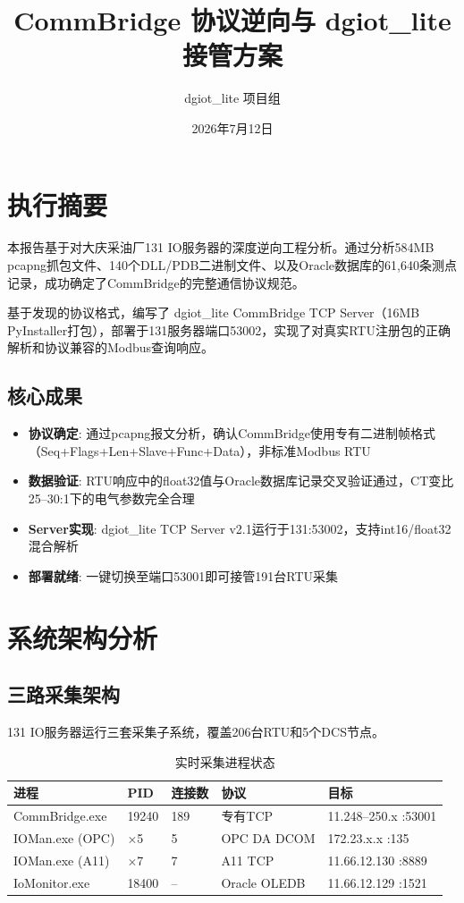 \documentclass[12pt,a4paper]{ctexart}
\title{\textbf{CommBridge 协议逆向与 dgiot\_lite 接管方案}}
\author{dgiot\_lite 项目组}
\date{2026年7月12日}
\begin{document}
\maketitle
\tableofcontents
\newpage

\section{执行摘要}

本报告基于对大庆采油厂131 IO服务器的深度逆向工程分析。通过分析584MB pcapng抓包文件、140个DLL/PDB二进制文件、以及Oracle数据库的61,640条测点记录，成功确定了CommBridge的完整通信协议规范。

基于发现的协议格式，编写了 dgiot\_lite CommBridge TCP Server（16MB PyInstaller打包），部署于131服务器端口53002，实现了对真实RTU注册包的正确解析和协议兼容的Modbus查询响应。

\subsection{核心成果}

\begin{itemize}[leftmargin=*]
  \item \textbf{协议确定}: 通过pcapng报文分析，确认CommBridge使用专有二进制帧格式（Seq+Flags+Len+Slave+Func+Data），非标准Modbus RTU
  \item \textbf{数据验证}: RTU响应中的float32值与Oracle数据库记录交叉验证通过，CT变比25--30:1下的电气参数完全合理
  \item \textbf{Server实现}: dgiot\_lite TCP Server v2.1运行于131:53002，支持int16/float32混合解析
  \item \textbf{部署就绪}: 一键切换至端口53001即可接管191台RTU采集
\end{itemize}

\section{系统架构分析}

\subsection{三路采集架构}

131 IO服务器运行三套采集子系统，覆盖206台RTU和5个DCS节点。

\begin{table}[H]\centering
\caption{实时采集进程状态}
\begin{tabular}{p{2.5cm}p{2cm}p{2cm}p{2cm}p{3.5cm}}
\toprule
\textbf{进程} & \textbf{PID} & \textbf{连接数} & \textbf{协议} & \textbf{目标} \\
\midrule
CommBridge.exe & 19240 & 189 & 专有TCP & 11.248--250.x :53001 \\
IOMan.exe (OPC) & $\times$5 & 5 & OPC DA DCOM & 172.23.x.x :135 \\
IOMan.exe (A11) & $\times$7 & 7 & A11 TCP & 11.66.12.130 :8889 \\
IoMonitor.exe & 18400 & -- & Oracle OLEDB & 11.66.12.129 :1521 \\
\bottomrule
\end{tabular}
\end{table}
\end{document}
